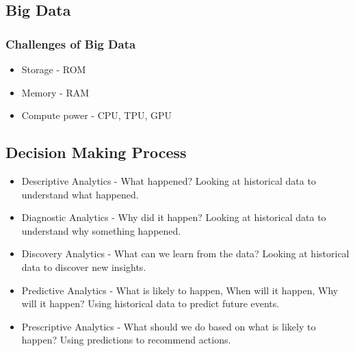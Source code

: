 \documentclass[12pt letter]{report}
\begin{document}
\subsection{Big Data}

\subsubsection{Challenges of Big Data}
\begin{itemize}
  \item Storage - ROM
  \item Memory - RAM
  \item Compute power - CPU, TPU, GPU
\end{itemize}

\subsection{Decision Making Process}

\begin{itemize}
  \item Descriptive Analytics  - What happened? Looking at historical data to understand what happened.
  \item Diagnostic Analytics - Why did it happen? Looking at historical data to understand why something happened.
  \item Discovery Analytics - What can we learn from the data? Looking at historical data to discover new insights.
  \item Predictive Analytics - What is likely to happen, When will it happen, Why will it happen? Using historical data to predict future events.
  \item Prescriptive Analytics - What should we do based on what is likely to happen? Using predictions  to recommend actions.
\end{itemize}
\end{document}
